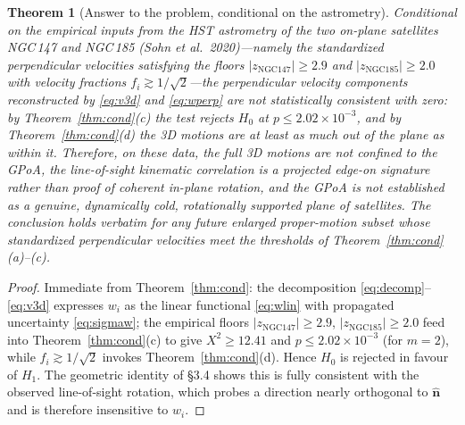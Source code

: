 \documentclass{amsart}
\newtheorem{theorem}{Theorem}
\theoremstyle{definition}
\begin{document}
\begin{theorem}[Answer to the problem, conditional on the astrometry]\label{thm:main}
\emph{Conditional on the empirical inputs} from the HST astrometry of the two
on-plane satellites NGC\,147 and NGC\,185 (Sohn et al.\ 2020)---namely the
standardized perpendicular velocities satisfying the floors
$|z_{\mathrm{NGC147}}|\ge 2.9$ and $|z_{\mathrm{NGC185}}|\ge 2.0$ with
velocity fractions $f_i\gtrsim1/\sqrt2$---the perpendicular velocity
components reconstructed by \eqref{eq:v3d} and \eqref{eq:wperp} are
\emph{not} statistically consistent with zero: by
Theorem~\ref{thm:cond}(c) the test rejects $H_0$ at
$p\le 2.02\times10^{-3}$, and by Theorem~\ref{thm:cond}(d) the 3D motions are
at least as much out of the plane as within it. Therefore, on these data, the
full 3D motions are \emph{not} confined to the GPoA, the line-of-sight
kinematic correlation is a projected edge-on signature rather than proof of
coherent in-plane rotation, and the GPoA is not established as a genuine,
dynamically cold, rotationally supported plane of satellites. The conclusion
holds verbatim for any future enlarged proper-motion subset whose
standardized perpendicular velocities meet the thresholds of
Theorem~\ref{thm:cond}(a)--(c).
\end{theorem}
\begin{proof}
Immediate from Theorem~\ref{thm:cond}: the decomposition
\eqref{eq:decomp}--\eqref{eq:v3d} expresses $w_i$ as the linear functional
\eqref{eq:wlin} with propagated uncertainty \eqref{eq:sigmaw}; the empirical
floors $|z_{\mathrm{NGC147}}|\ge 2.9$, $|z_{\mathrm{NGC185}}|\ge 2.0$ feed
into Theorem~\ref{thm:cond}(c) to give $X^2\ge 12.41$ and
$p\le 2.02\times10^{-3}$ (for $m=2$), while $f_i\gtrsim 1/\sqrt2$ invokes
Theorem~\ref{thm:cond}(d). Hence $H_0$ is rejected in favour of $H_1$. The
geometric identity of \S3.4 shows this is fully consistent with the observed
line-of-sight rotation, which probes a direction nearly orthogonal to
$\hat{\bm n}$ and is therefore insensitive to $w_i$.
\end{proof}
\end{document}
